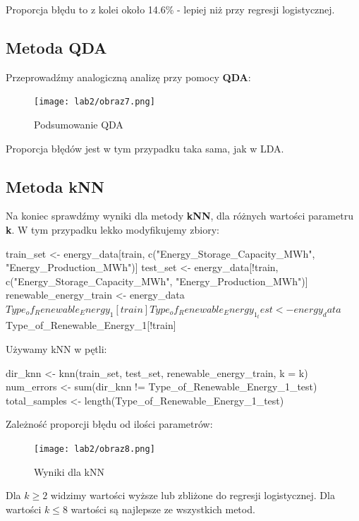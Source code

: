 Proporcja błędu to z kolei około 14.6\% - lepiej niż przy regresji logistycznej.

\subsection{Metoda QDA}
Przeprowadźmy analogiczną analizę przy pomocy \textbf{QDA}:


\begin{figure}[H]
    \centering
    \texttt{[image: lab2/obraz7.png]}
    \caption{Podsumowanie QDA}
    \label{fig:enter-label}
\end{figure}

Proporcja błędów jest w tym przypadku taka sama, jak w LDA.

\subsection{Metoda kNN}
Na koniec sprawdźmy wyniki dla metody \textbf{kNN}, dla różnych wartości parametru \textbf{k}. W tym przypadku lekko modyfikujemy zbiory:

\begin{Rcode}
train_set <- energy_data[train, c("Energy_Storage_Capacity_MWh", "Energy_Production_MWh")]
test_set <- energy_data[!train, c("Energy_Storage_Capacity_MWh", "Energy_Production_MWh")]
renewable_energy_train <- energy_data$Type_of_Renewable_Energy_1[train]
Type_of_Renewable_Energy_1_test <- energy_data$Type_of_Renewable_Energy_1[!train]  
\end{Rcode}

Używamy kNN w pętli:
\begin{Rcode}
dir_knn <- knn(train_set, test_set, renewable_energy_train, k = k)
num_errors <- sum(dir_knn != Type_of_Renewable_Energy_1_test)
total_samples <- length(Type_of_Renewable_Energy_1_test)
\end{Rcode}

Zależność proporcji błędu od ilości parametrów:

\begin{figure}[H]
    \centering
    \texttt{[image: lab2/obraz8.png]}
    \caption{Wyniki dla kNN}
    \label{fig:enter-label}
\end{figure}

Dla \( k \geq 2 \) widzimy wartości wyższe lub zbliżone do regresji logistycznej. Dla wartości \( k \leq 8 \) wartości są najlepsze ze wszystkich metod.

